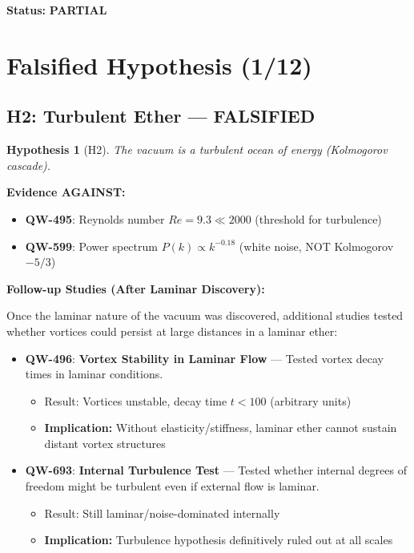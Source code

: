 \documentclass[11pt, a4paper]{article}
\newtheorem{hypothesis}{Hypothesis}[section]
\theoremstyle{remark}
\newcommand{\QW}[1]{\textbf{QW-#1}}
\begin{document}
\textbf{Status:} \textbf{PARTIAL}

\section{Falsified Hypothesis (1/12)}

\subsection{H2: Turbulent Ether --- FALSIFIED}

\begin{hypothesis}[H2]
The vacuum is a turbulent ocean of energy (Kolmogorov cascade).
\end{hypothesis}

\textbf{Evidence AGAINST:}
\begin{itemize}
    \item \QW{495}: Reynolds number $Re = 9.3 \ll 2000$ (threshold for turbulence)
    \item \QW{599}: Power spectrum $P(k) \propto k^{-0.18}$ (white noise, NOT Kolmogorov $-5/3$)
\end{itemize}

\textbf{Follow-up Studies (After Laminar Discovery):}

Once the laminar nature of the vacuum was discovered, additional studies tested whether vortices could persist at large distances in a laminar ether:

\begin{itemize}
    \item \QW{496}: \textbf{Vortex Stability in Laminar Flow} --- Tested vortex decay times in laminar conditions.
    \begin{itemize}
        \item Result: Vortices unstable, decay time $t < 100$ (arbitrary units)
        \item \textbf{Implication:} Without elasticity/stiffness, laminar ether cannot sustain distant vortex structures
    \end{itemize}
    
    \item \QW{693}: \textbf{Internal Turbulence Test} --- Tested whether internal degrees of freedom might be turbulent even if external flow is laminar.
    \begin{itemize}
        \item Result: Still laminar/noise-dominated internally
        \item \textbf{Implication:} Turbulence hypothesis definitively ruled out at all scales
    \end{itemize}
\end{itemize}
\end{document}
